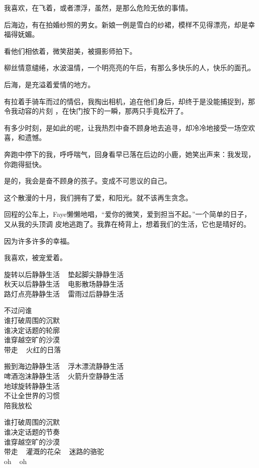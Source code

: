 \documentclass[12pt,a4paper]{article}
\begin{document}
		我喜欢，在飞着，或者漂浮，虽然，是那么危险无依的事情。


		后海边，有在拍婚纱照的男女。新娘一例是雪白的纱裙，模样不见得漂亮，却是幸福得妩媚。

		看他们相依着，微笑甜美，被摄影师拍下。

		柳丝情意缱绻，水波温情，一个明亮亮的午后，有那么多快乐的人，快乐的面孔。

		后海，是充溢着爱情的地方。

		有拉着手骑车而过的情侣，我掏出相机，追在他们身后，却终于是没能捕捉到，那令我动容的片刻
	，在快门按下的一瞬，那两只手竟松开了。

		有多少时刻，是如此的呢，让我热烈中奋不顾身地去追寻，却冷冷地接受一场空欢喜，和遗憾。

		奔跑中停下的我，呼呼喘气，回身看早已落在后边的小鹿，她笑出声来：我发现，你跑得挺快。

		是的，我会是奋不顾身的孩子。变成不可思议的自己。


		这个散漫的十月，我们拥有了爱，和阳光。就不该再生贪念。

		回程的公车上，Faye懒懒地唱，“爱你的微笑，爱到担当不起。”一个简单的日子，又从我的头顶调
	皮地逃跑了。我靠在椅背上，想着我们的生活，它也是晴好的。


		因为许多许多的幸福。

		我喜欢，被宠爱着。

	\endwriting



		\longpoem{}{}{} \centering
		旋转以后静静生活 ~ 垫起脚尖静静生活 \\
		秋天以后静静生活 ~ 电影散场静静生活 \\
		路灯点亮静静生活 ~ 雷雨过后静静生活

		不过问谁 \\
		谁打破周围的沉默 \\
		谁决定话题的轮廓 \\
		谁穿越空旷的沙漠 \\
		带走 ~ 火红的日落

		搬到海边静静生活 ~ 浮木漂流静静生活 \\
		啤酒泡沫静静生活 ~ 火箭升空静静生活 \\
		地球旋转静静生活 \\
		不让全世界的习惯 \\
		陪我放松

		谁打破周围的沉默 \\
		谁决定话题的节奏 \\
		谁穿越空旷的沙漠 \\
		带走 ~ 灌溉的花朵 ~ 迷路的骆驼 \\
		oh ~ oh
\end{document}
